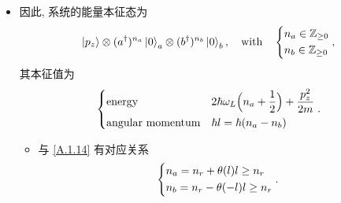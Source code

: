 \begin{itemize}
	\item 因此, 系统的能量本征态为
	\begin{equation}
		\ket{p_z} \otimes (a^\dag)^{n_a} \ket{0}_a \otimes (b^\dag)^{n_b} \ket{0}_b, \quad \text{with} \quad \begin{dcases}
			n_a \in \mathbb{Z}_{\geq 0} \\
			n_b \in \mathbb{Z}_{\geq 0}
		\end{dcases},
	\end{equation}
	其本征值为
	\begin{equation}
		\begin{dcases}
			\text{energy} & 2 \hbar \omega_L \Big( n_a + \frac{1}{2} \Big) + \frac{p_z^2}{2 m} \\
			\text{angular momentum} & \hbar l = \hbar (n_a - n_b)
		\end{dcases}.
	\end{equation}
	\begin{itemize}
		\item 与 \eqref{A.1.14} 有对应关系
		\begin{equation}
			\begin{dcases}
				n_a = n_r + \theta(l) l \geq n_r \\
				n_b = n_r - \theta(- l) l \geq n_r
			\end{dcases}.
		\end{equation}
	\end{itemize}
\end{itemize}

